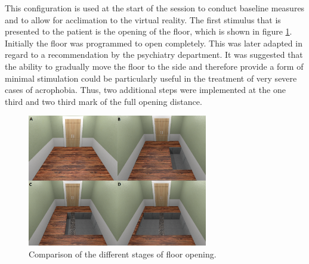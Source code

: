 This configuration is used at the start of the session to conduct baseline measures and to allow for acclimation to the virtual reality. The first stimulus that is presented to the patient is the opening of the floor, which is shown in figure \ref{OpenImg}. Initially the floor was programmed to open completely. This was later adapted in regard to a recommendation by the psychiatry department. It was suggested that the ability to gradually move the floor to the side and therefore provide a form of minimal stimulation could be particularly useful in the treatment of very severe cases of acrophobia. Thus, two additional steps were implemented at the one third and two third mark of the full opening distance.

\begin{figure}[ht]
\centering
\includegraphics[width=0.7\textwidth]{images/OpenComparison.png}
\caption{Comparison of the different stages of floor opening.}
\label{OpenImg}
\end{figure}

